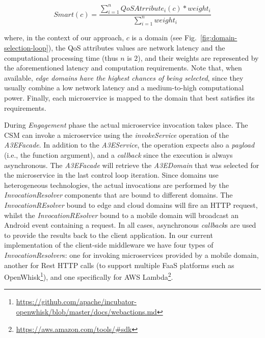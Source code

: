 \begin{equation}
Smart(c) = \frac{\sum_{i=1}^{n} QoSAtrribute_i(c)*weight_i}{\sum_{i=1}^{n}weight_i} \label{eq:smart}
\end{equation}

\noindent
where, in the context of our approach, $c$ is a domain (see Fig.~\ref{fig:domain-selection-loop}), the QoS attributes values are network latency and the computational processing time (thus $n$ is $2$), and their weights are represented by the aforementioned latency and computation requirements. Note that, when available, \textit{edge domains have the highest chances of being selected}, since they usually combine a low network latency and a medium-to-high computational power. Finally, each microservice is mapped to the domain that best satisfies its requirements. 


During \textit{Engagement} phase the actual microservice invocation takes place. The CSM can invoke a microservice using the \textit{invokeService} operation of the  \textit{A3EFacade}. In addition to the \textit{A3EService}, the operation expects also a \textit{payload} (i.e., the function argument), and a \textit{callback} since the execution is always asynchronous. 
The \textit{A3EFacade} will retrieve the \textit{A3EDomain} that was selected for the microservice in the last control loop iteration. Since domains use heterogeneous technologies, the actual invocations are performed by the \textit{InvocationResolver} components that are bound to different domains. 
The \textit{InvocationREsolver} bound to edge and cloud domains will fire an HTTP request, whilst the \textit{InvocationREsolver} bound to a mobile domain will broadcast an Android event containing a request. In all cases, asynchronous \textit{callback}s are used to provide the results back to the client application. %
In our current implementation of the client-side middleware we have four types of \textit{InvocationResolver}s: one for invoking microservices provided by a mobile domain, another for Rest HTTP calls (to support multiple FaaS platforms such as OpenWhisk\footnote{\url{https://github.com/apache/incubator-openwhisk/blob/master/docs/webactions.md}}), and one specifically for AWS Lambda\footnote{\url{https://aws.amazon.com/tools/\#sdk}}. %


